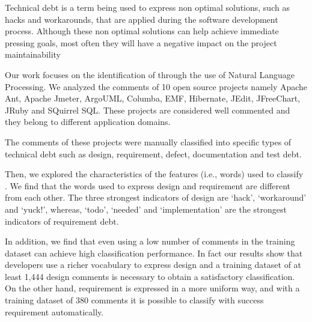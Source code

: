 Technical debt is a term being used to express non optimal solutions, such as hacks and workarounds, that are applied during the software development process. Although these non optimal solutions can help achieve immediate pressing goals, most often they will have a negative impact on the project maintainability 

Our work focuses on the identification of \SATD through the use of Natural Language Processing. We analyzed the comments of 10 open source projects namely Apache Ant, Apache Jmeter, ArgoUML, Columba, EMF, Hibernate, JEdit, JFreeChart, JRuby and SQuirrel SQL. These projects are considered well commented and they belong to different application domains.

The comments of these projects were manually classified into specific types of technical debt such as design, requirement, defect, documentation and test debt. 


Then, we explored the characteristics of the features (i.e., words) used to classify \SATD. We find that the words used to express design and requirement \SATD are different from each other. The three strongest indicators of design \SATD are `hack', `workaround' and `yuck!', whereas, `todo', `needed' and `implementation' are the strongest indicators of requirement debt.
 
In addition, we find that even using a low number of \SATD comments in the training dataset can achieve high classification performance. In fact our results show that developers use a richer vocabulary to express design \SATD and a training dataset of at least 1,444 design \SATD comments is necessary to obtain a satisfactory classification. On the other hand, requirement \SATD is expressed in a more uniform way, and with a training dataset of 380 \SATD comments it is possible to classify with success requirement \SATD automatically.

